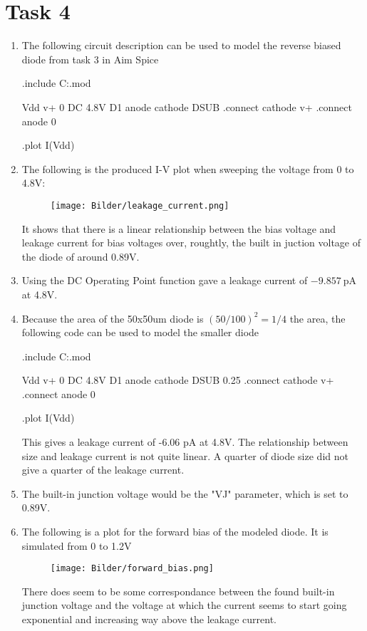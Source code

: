 \documentclass[a4paper,11pt,norsk]{article}
\begin{document}
\section*{Task 4}
\begin{enumerate}
\item The following circuit description can be used to model the reverse biased diode from task 3 in Aim Spice
\begin{pythoncode}
.include C:\Users\morte\Downloads\DBSBdiode.mod

Vdd v+ 0 DC 4.8V
D1 anode cathode DSUB
.connect cathode v+
.connect anode 0

.plot I(Vdd)
\end{pythoncode}
\item The following is the produced I-V plot when sweeping the voltage from 0 to 4.8V:
    \begin{figure}[H]
        \centering
        \texttt{[image: Bilder/leakage\_current.png]}
    \end{figure}
    It shows that there is a linear relationship between the bias voltage and leakage current for 
    bias voltages over, roughtly, the built in juction voltage of the diode of around 0.89V.
\item Using the DC Operating Point function gave a leakage current of $\SI{-9.857}{\pico\ampere}$ at 4.8V.
\item Because the area of the 50x50um diode is $(50/100)^2 = 1/4$ the area, the following code can be used to model the smaller diode 
\begin{pythoncode}
.include C:\Users\morte\Downloads\DBSBdiode.mod

Vdd v+ 0 DC 4.8V
D1 anode cathode DSUB 0.25
.connect cathode v+
.connect anode 0

.plot I(Vdd)
\end{pythoncode}
    This gives a leakage current of -6.06 pA at 4.8V. The relationship between size and leakage current is not quite linear. A quarter of 
    diode size did not give a quarter of the leakage current.
\item The built-in junction voltage would be the "VJ" parameter, which is set to 0.89V.
\item The following is a plot for the forward bias of the modeled diode. It is simulated from 0 to 1.2V
    \begin{figure}[H]
        \centering
        \texttt{[image: Bilder/forward\_bias.png]}
    \end{figure}
    There does seem to be some correspondance between the found built-in junction voltage and 
    the voltage at which the current seems to start going exponential and increasing way above the leakage current.
\end{enumerate}
\end{document}
